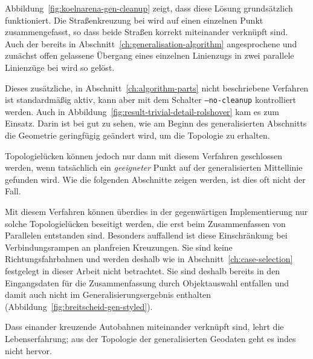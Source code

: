 \documentclass[../main/thesis.tex]{subfiles}
\begin{document}
Abbildung~\ref{fig:koelnarena-gen-cleanup} zeigt, dass diese Lösung grundsätzlich funktioniert.
Die Straßenkreuzung bei  wird auf einen einzelnen Punkt zusammengefasst, so dass beide Straßen korrekt miteinander verknüpft sind.
Auch der bereits in Abschnitt~\ref{ch:generalisation-algorithm} angesprochene und zunächst offen gelassene Übergang eines einzelnen Linienzugs in zwei parallele Linienzüge bei  wird so gelöst.

Dieses zusätzliche, in Abschnitt~\ref{ch:algorithm-parts} nicht beschriebene Verfahren ist standardmäßig aktiv, kann aber mit dem Schalter \texttt{--no-cleanup} kontrolliert werden.
Auch in Abbildung~\ref{fig:result-trivial-detail-rolshover} kam es zum Einsatz.
Darin ist bei  gut zu sehen, wie am Beginn des generalisierten Abschnitts die Geometrie geringfügig geändert wird, um die Topologie zu erhalten.

Topologielücken können jedoch nur dann mit diesem Verfahren geschlossen werden, wenn tatsächlich ein \emph{geeigneter} Punkt auf der generalisierten Mittellinie gefunden wird.
Wie die folgenden Abschnitte zeigen werden, ist dies oft nicht der Fall.

Mit diesem Verfahren können überdies in der gegenwärtigen Implementierung nur solche Topologielücken beseitigt werden, die erst beim Zusammenfassen von Parallelen entstanden sind.
Besonders auffallend ist diese Einschränkung bei Verbindungsrampen an planfreien Kreuzungen.
Sie sind keine Richtungsfahrbahnen und werden deshalb wie in Abschnitt~\ref{ch:case-selection} festgelegt in dieser Arbeit nicht betrachtet.
Sie sind deshalb bereits in den Eingangsdaten für die Zusammenfassung durch Objektauswahl entfallen und damit auch nicht im Generalisierungsergebnis enthalten (Abbildung~\ref{fig:breitscheid-gen-styled}).

Dass einander kreuzende Autobahnen miteinander verknüpft sind, lehrt die Lebenserfahrung; aus der Topologie der generalisierten Geodaten geht es indes nicht hervor.

\end{document}
